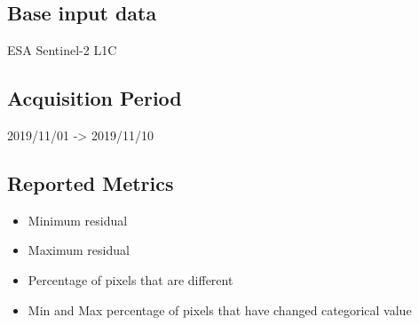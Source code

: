 \documentclass[a4paper]{article}
\begin{document}
    \subsection{Base input data}

      ESA Sentinel-2 L1C

    \subsection{Acquisition Period}

      2019/11/01 -> 2019/11/10

    \subsection{Reported Metrics}
      \begin{itemize}
        \item Minimum residual
        \item Maximum residual
        \item Percentage of pixels that are different
        \item Min and Max percentage of pixels that have changed categorical value
      \end{itemize}
\end{document}
